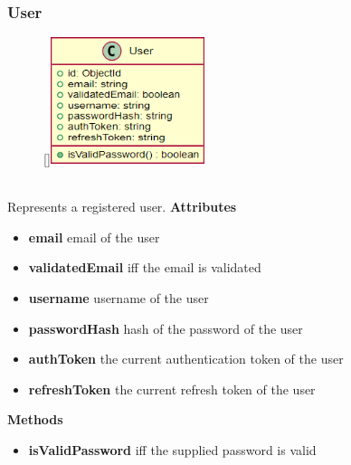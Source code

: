 \subsubsection{User}
\label{User}
\begin{figure}
    \raisebox{0pt}[\dimexpr{}\baselineskip\relax]{\includegraphics[width=4.5cm]{classes/auth/2.png}}
\end{figure}
~\\
Represents a registered user.
\newline
\newline
\newline
\newline
\newline
\newline
\newline
\newline
\newline
\textbf{Attributes}
\begin{itemize}
    \item \textbf{email} email of the user
    \item \textbf{validatedEmail} iff the email is validated
    \item \textbf{username} username of the user
    \item \textbf{passwordHash} hash of the password of the user
    \item \textbf{authToken} the current authentication token of the user
    \item \textbf{refreshToken} the current refresh token of the user
\end{itemize}
\textbf{Methods}
\begin{itemize}
    \item \textbf{isValidPassword} iff the supplied password is valid
\end{itemize}
\newpage
